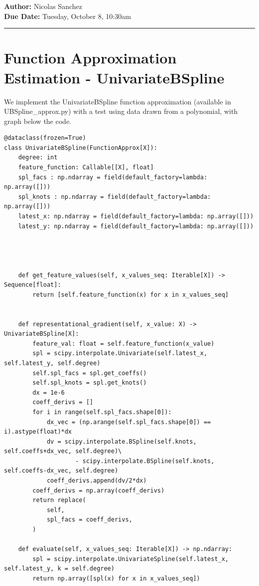 \documentclass{article}[12pt]
\newcommand{\headings}[4]{\noindent {\bf Assignment 5 CME241} \hfill {{\bf Author:} Nicolas Sanchez} \\
{} \hfill {{\bf Due Date:} #2} \\

\rule[0.1in]{\textwidth}{0.025in}
}
\begin{document}
\headings{\#1}{Tuesday, October 8, 10:30am}\section{} 



\section{Function Approximation Estimation - UnivariateBSpline}
We implement the UnivariateBSpline function approximation (available in UBSpline\_approx.py) with a test using data drawn from a polynomial, with graph below the code.

\begin{lstlisting}
@dataclass(frozen=True)
class UnivariateBSpline(FunctionApprox[X]):
    degree: int
    feature_function: Callable[[X], float]
    spl_facs : np.ndarray = field(default_factory=lambda: np.array([]))
    spl_knots : np.ndarray = field(default_factory=lambda: np.array([]))
    latest_x: np.ndarray = field(default_factory=lambda: np.array([]))
    latest_y: np.ndarray = field(default_factory=lambda: np.array([]))




    def get_feature_values(self, x_values_seq: Iterable[X]) -> Sequence[float]:
        return [self.feature_function(x) for x in x_values_seq]


    def representational_gradient(self, x_value: X) -> UnivariateBSpline[X]:
        feature_val: float = self.feature_function(x_value)
        spl = scipy.interpolate.Univariate(self.latest_x, self.latest_y, self.degree)
        self.spl_facs = spl.get_coeffs()
        self.spl_knots = spl.get_knots()
        dx = 1e-6
        coeff_derivs = []
        for i in range(self.spl_facs.shape[0]):
            dx_vec = (np.arange(self.spl_facs.shape[0]) == i).astype(float)*dx
            dv = scipy.interpolate.BSpline(self.knots, self.coeffs+dx_vec, self.degree)\
                    - scipy.interpolate.BSpline(self.knots, self.coeffs-dx_vec, self.degree)
            coeff_derivs.append(dv/2*dx)
        coeff_derivs = np.array(coeff_derivs)
        return replace(
            self,
            spl_facs = coeff_derivs,
        )

    def evaluate(self, x_values_seq: Iterable[X]) -> np.ndarray:
        spl = scipy.interpolate.UnivariateSpline(self.latest_x, self.latest_y, k = self.degree)
        return np.array([spl(x) for x in x_values_seq])


\end{lstlisting}
\end{document}
